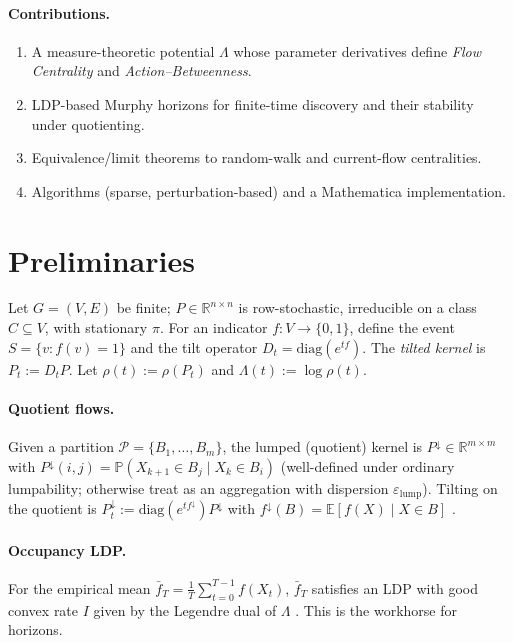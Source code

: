 \documentclass[11pt]{article}
\newcommand{\E}{\mathbb{E}}
\newcommand{\R}{\mathbb{R}}
\newcommand{\Prob}{\mathbb{P}}
\newcommand{\1}{\mathbbm{1}}
\begin{document}
\paragraph{Contributions.}
\begin{enumerate}[leftmargin=1.3em]
\item A measure-theoretic potential $\Lambda$ whose parameter derivatives define \emph{Flow Centrality} and \emph{Action--Betweenness}.
\item LDP-based Murphy horizons for finite-time discovery and their stability under quotienting.
\item Equivalence/limit theorems to random-walk and current-flow centralities.
\item Algorithms (sparse, perturbation-based) and a Mathematica implementation.
\end{enumerate}

\section{Preliminaries}\label{sec:prelim}
Let $G=(V,E)$ be finite; $P\in\R^{n\times n}$ is row-stochastic, irreducible on a class $C\subseteq V$, with stationary $\pi$. For an indicator $f:V\to\{0,1\}$, define the event $S=\{v:f(v)=1\}$ and the tilt operator $D_t=\mathrm{diag}(e^{t f})$. The \emph{tilted kernel} is $P_t:=D_t P$. Let $\rho(t):=\rho(P_t)$ and $\Lambda(t):=\log\rho(t)$.

\paragraph{Quotient flows.}
Given a partition $\mathcal{P}=\{B_1,\dots,B_m\}$, the lumped (quotient) kernel is $P^{\downarrow}\in\R^{m\times m}$ with $P^{\downarrow}(i,j)=\Prob(X_{k+1}\in B_j\mid X_k\in B_i)$ (well-defined under ordinary lumpability; otherwise treat as an aggregation with dispersion $\varepsilon_{\mathrm{lump}}$). Tilting on the quotient is $P^{\downarrow}_t:=\mathrm{diag}(e^{t f^{\downarrow}})P^{\downarrow}$ with $f^{\downarrow}(B)=\E[f(X)\mid X\in B]$ \parencite{elliott2025qfi}.

\paragraph{Occupancy LDP.}
For the empirical mean $\bar f_T=\frac1T\sum_{t=0}^{T-1} f(X_t)$, $\bar f_T$ satisfies an LDP with good convex rate $I$ given by the Legendre dual of $\Lambda$ \parencite[Chs.~3--4]{DemboZeitouni1998}. This is the workhorse for horizons.
\end{document}
